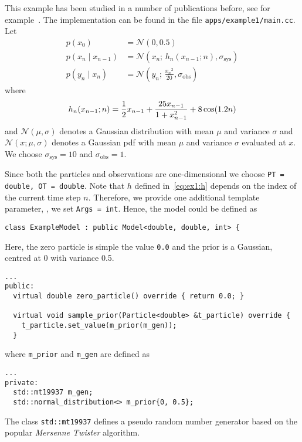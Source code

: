 \begin{example}\label{ex:1}
  This example has been studied in a number of publications before,
  see for example~\cite{arulampalam,gordon,kitagawa}. The
  implementation can be found in the file
  \texttt{apps/example1/main.cc}. Let
  \begin{align*}
    p(x_0) &= \mathcal{N}(0,0.5)\\
    p(x_n \mid x_{n-1}) &= \mathcal{N}(x_n;\, h_n(x_{n-1};n), \sigma_{\text{sys}})\\
    p(y_n \mid x_n) &= \mathcal{N}(y_n;\, \frac{{x_n}^2}{20},
                      \sigma_{\text{obs}})
  \end{align*}
  where
  \begin{equation}
    \label{eq:ex1:h}
    h_n(x_{n-1};n) = \frac{1}{2}x_{n-1} + \frac{25 x_{n-1}}{1 + x_{n-1}^2} + 8 \cos(1.2n) \\
  \end{equation}
  and $\mathcal{N}(\mu, \sigma)$ denotes a Gaussian distribution with
  mean $\mu$ and variance $\sigma$ and $\mathcal{N}(x; \mu, \sigma)$ denotes a Gaussian pdf with
  mean $\mu$ and variance $\sigma$ evaluated at $x$. We choose
  $\sigma_{\text{sys}} = 10$ and $\sigma_{\text{obs}} = 1$.

  Since both the particles and observations are one-dimensional we
  choose \texttt{PT = double,\ OT = double}. Note that $h$ defined
  in~\eqref{eq:ex1:h} depends on the index of the current time step
  $n$. Therefore, we provide one additional template parameter, \ie,
  we set \texttt{Args = int}. Hence, the model could be defined as
\begin{verbatim}
class ExampleModel : public Model<double, double, int> {
\end{verbatim}
  Here, the zero particle is simple the value \texttt{0.0} and the
  prior is a Gaussian, centred at 0 with variance 0.5.
\begin{verbatim}
...
public:
  virtual double zero_particle() override { return 0.0; }

  virtual void sample_prior(Particle<double> &t_particle) override {
    t_particle.set_value(m_prior(m_gen));
  }
\end{verbatim}
  where \texttt{m\_prior} and \texttt{m\_gen} are defined as
\begin{verbatim}
...
private:
  std::mt19937 m_gen;
  std::normal_distribution<> m_prior{0, 0.5};
\end{verbatim}
  The class \texttt{std::mt19937} defines a pseudo random number
  generator based on the popular \emph{Mersenne Twister} algorithm.


\end{example}
